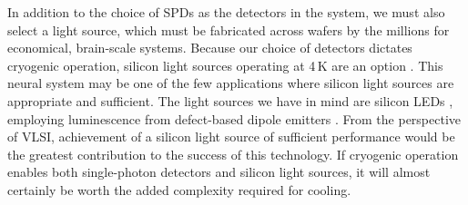 \documentclass[twocolumn]{article}
\begin{document}
In addition to the choice of SPDs as the detectors in the system, we must also select a light source, which must be fabricated across wafers by the millions for economical, brain-scale systems. Because our choice of detectors dictates cryogenic operation, silicon light sources operating at 4\,K are an option \cite{da1989,shxu2007}. This neural system may be one of the few applications where silicon light sources are appropriate and sufficient. The light sources we have in mind are silicon LEDs \cite{buch2017}, employing luminescence from defect-based dipole emitters \cite{dali1987,absa2018}. From the perspective of VLSI, achievement of a silicon light source of sufficient performance would be the greatest contribution to the success of this technology. If cryogenic operation enables both single-photon detectors and silicon light sources, it will almost certainly be worth the added complexity required for cooling.
\end{document}
